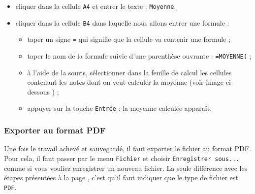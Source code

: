 \begin{itemize}
\item cliquer dans la cellule \texttt{A4} et entrer le texte : \texttt{Moyenne}. 
\item cliquer dans la cellule \texttt{B4} dans laquelle nous allons entrer une formule : 
        \begin{itemize}
        \item taper un signe \texttt{=} qui signifie que la cellule va contenir une formule ;
        \item taper le nom de la formule suivie d'une parenthèse ouvrante : \texttt{=MOYENNE(} ;
        \item à l'aide de la souris, sélectionner dans la feuille de calcul les cellules contenant les notes dont on veut calculer la moyenne (voir image ci-dessous ) ;
        \item appuyer sur la touche \texttt{Entrée} : la moyenne calculée apparaît.
        \end{itemize}
\end{itemize}



\subsubsection{Exporter au format PDF}

Une fois le travail achevé et sauvegardé, il faut exporter le fichier au format PDF. Pour cela, il faut passer par le menu \texttt{Fichier} et choisir \texttt{Enregistrer sous...} comme si vous vouliez enregistrer un nouveau fichier. La seule différence avec les étapes présentées à la page \pageref{ssec_sauvegarder_fichier}, c'est qu'il faut indiquer que le type de fichier est \texttt{PDF}. 







